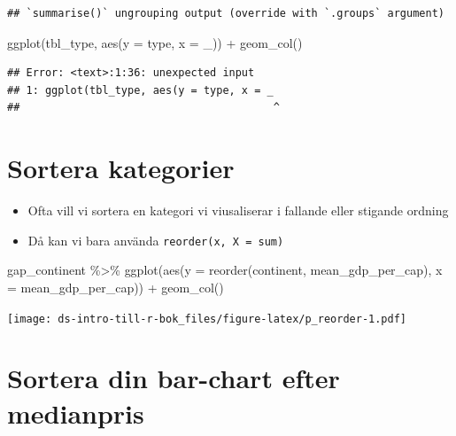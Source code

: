 \documentclass[
]{book}
\newenvironment{Shaded}{\begin{snugshade}}{\end{snugshade}}
\newcommand{\AttributeTok}[1]{\textcolor[rgb]{0.77,0.63,0.00}{#1}}
\newcommand{\FunctionTok}[1]{\textcolor[rgb]{0.00,0.00,0.00}{#1}}
\newcommand{\NormalTok}[1]{#1}
\newcommand{\SpecialCharTok}[1]{\textcolor[rgb]{0.00,0.00,0.00}{#1}}
\providecommand{\tightlist}{%
  \setlength{\itemsep}{0pt}\setlength{\parskip}{0pt}}
\begin{document}
\begin{verbatim}
## `summarise()` ungrouping output (override with `.groups` argument)
\end{verbatim}

\begin{Shaded}
\begin{Highlighting}[]
\FunctionTok{ggplot}\NormalTok{(tbl\_type, }\FunctionTok{aes}\NormalTok{(}\AttributeTok{y =}\NormalTok{ type, }\AttributeTok{x =}\NormalTok{ \_)) }\SpecialCharTok{+}
  \FunctionTok{geom\_col}\NormalTok{()}
\end{Highlighting}
\end{Shaded}

\begin{verbatim}
## Error: <text>:1:36: unexpected input
## 1: ggplot(tbl_type, aes(y = type, x = _
##                                        ^
\end{verbatim}

\hypertarget{sortera-kategorier}{%
\section{Sortera kategorier}\label{sortera-kategorier}}

\begin{itemize}
\tightlist
\item
  Ofta vill vi sortera en kategori vi viusaliserar i fallande eller stigande ordning
\item
  Då kan vi bara använda \texttt{reorder(x,\ X\ =\ sum)}
\end{itemize}

\begin{Shaded}
\begin{Highlighting}[]
\NormalTok{gap\_continent }\SpecialCharTok{\%\textgreater{}\%} 
  \FunctionTok{ggplot}\NormalTok{(}\FunctionTok{aes}\NormalTok{(}\AttributeTok{y =} \FunctionTok{reorder}\NormalTok{(continent, mean\_gdp\_per\_cap), }\AttributeTok{x =}\NormalTok{ mean\_gdp\_per\_cap)) }\SpecialCharTok{+}
  \FunctionTok{geom\_col}\NormalTok{()}
\end{Highlighting}
\end{Shaded}

\texttt{[image: ds-intro-till-r-bok\_files/figure-latex/p\_reorder-1.pdf]}

\hypertarget{sortera-din-bar-chart-efter-medianpris}{%
\section{Sortera din bar-chart efter medianpris}\label{sortera-din-bar-chart-efter-medianpris}}
\end{document}
